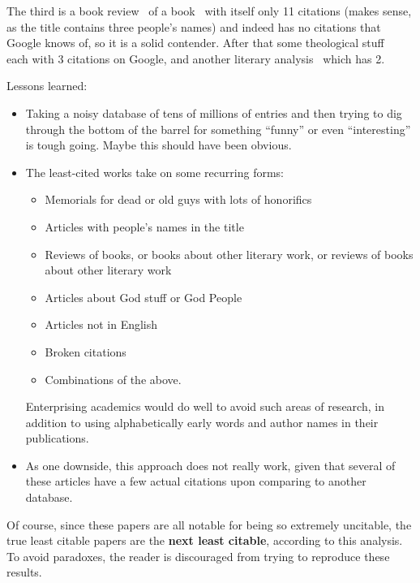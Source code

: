 \documentclass[twocolumn]{article}
\begin{document}
The third is a book review~\cite{holmes2015narratives} of a
book~\cite{frederick2012narratives} with itself only 11 citations
(makes sense, as the title contains three people's names) and indeed
has no citations that Google knows of, so it is a solid contender.
After that some theological
stuff~\cite{torrance2000catherine,lynch1957texts} each with 3
citations on Google, and another literary
analysis~\cite{fitzpatrick2005shakespeare} which has 2.

Lessons learned:
\begin{itemize}
\item Taking a noisy database of tens of millions of entries and then
  trying to dig through the bottom of the barrel for something
  ``funny'' or even ``interesting'' is tough going. Maybe this should
  have been obvious.
\item The least-cited works take on some recurring forms:
  \begin{itemize}
  \item Memorials for dead or old guys with lots of honorifics
  \item Articles with people's names in the title
  \item Reviews of books, or books about other literary work, or reviews of books about other literary work
  \item Articles about God stuff or God People
  \item Articles not in English
  \item Broken citations
  \item Combinations of the above.
  \end{itemize}
  Enterprising academics would do well to avoid such areas of research, in addition
  to using alphabetically early words and author names in their publications.
  
\item As one downside, this approach does not really work, given
  that several of these articles have a few actual citations upon
  comparing to another database.
\end{itemize}


\medskip
Of course, since these papers are all notable for being so extremely
uncitable, the true least citable papers are the {\bf next least
  citable}, according to this analysis. To avoid paradoxes, the
reader is discouraged from trying to reproduce these results.

\end{document}
